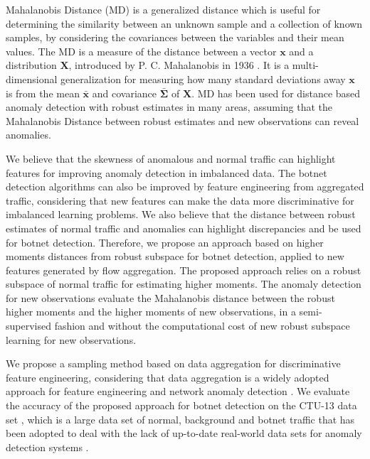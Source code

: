 \documentclass[review]{elsarticle}
\begin{document}
Mahalanobis Distance (MD) is a generalized distance which is useful for determining the similarity between an unknown sample and a collection of known samples, by considering the covariances between the variables and their mean values. The MD is a measure of the distance between a vector $\boldsymbol{x}$ and a distribution $\boldsymbol{X}$, introduced by P. C. Mahalanobis in 1936 \cite{mahalanobis1936md}. It is a multi-dimensional generalization for measuring how many standard deviations away $\boldsymbol{x}$ is from the mean $\boldsymbol{\bar{x}}$ and covariance $\boldsymbol{\bar{\Sigma}}$ of $\boldsymbol{X}$. MD has been used for distance based anomaly detection with robust estimates in many areas, assuming that the Mahalanobis Distance between robust estimates and new observations can reveal anomalies.

We believe that the skewness of anomalous and normal traffic can highlight features for improving anomaly detection in imbalanced data. The botnet detection algorithms can also be improved by feature engineering from aggregated traffic, considering that new features can make the data more discriminative for imbalanced learning problems. We also believe that the distance between robust estimates of normal traffic and anomalies can highlight discrepancies and be used for botnet detection. Therefore, we propose an approach based on higher moments distances from robust subspace for botnet detection, applied to new features generated by flow aggregation. The proposed approach relies on a robust subspace of normal traffic for estimating higher moments. The anomaly detection for new observations evaluate the Mahalanobis distance between the robust higher moments and the higher moments of new observations, in a semi-supervised fashion and without the computational cost of new robust subspace learning for new observations.

We propose a sampling method based on data aggregation for discriminative feature engineering, considering that data aggregation is a widely adopted approach for feature engineering \cite{garcia2014empirical, chandrashekar2014survey,acarali2016survey} and network anomaly detection \cite{lakhina2005mining, callegari2011novel, vieira2017model}. We evaluate the accuracy of the proposed approach for botnet detection on the CTU-13 data set \cite{garcia2014empirical}, which is a large data set of normal, background and botnet traffic that has been adopted to deal with the lack of up-to-date real-world data sets for anomaly detection systems \cite{osanaiye2016distributed}.
\end{document}
